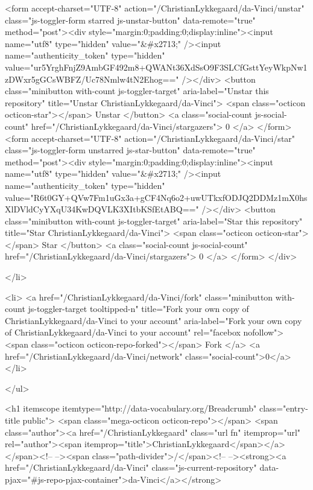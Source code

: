     <form accept-charset="UTF-8" action="/ChristianLykkegaard/da-Vinci/unstar" class="js-toggler-form starred js-unstar-button" data-remote="true" method="post"><div style="margin:0;padding:0;display:inline"><input name="utf8" type="hidden" value="&#x2713;" /><input name="authenticity_token" type="hidden" value="ur5YrghFnjZ9AmbGF492m8+QWANt36XdSsO9F3SLCfGsttYeyWkpNw1zDWxr5gGCsWBFZ/Uc78Nmlw4tN2Ehog==" /></div>
      <button
        class="minibutton with-count js-toggler-target"
        aria-label="Unstar this repository" title="Unstar ChristianLykkegaard/da-Vinci">
        <span class="octicon octicon-star"></span>
        Unstar
      </button>
        <a class="social-count js-social-count" href="/ChristianLykkegaard/da-Vinci/stargazers">
          0
        </a>
</form>
    <form accept-charset="UTF-8" action="/ChristianLykkegaard/da-Vinci/star" class="js-toggler-form unstarred js-star-button" data-remote="true" method="post"><div style="margin:0;padding:0;display:inline"><input name="utf8" type="hidden" value="&#x2713;" /><input name="authenticity_token" type="hidden" value="R6t0GY+QVw7Fm1uGx3a+gCF4Nq6o2+uwUTkxfODJQ2DDMz1mX0hsXlDVldCyYXqU34KwDQVLK3XItbKSfEtABQ==" /></div>
      <button
        class="minibutton with-count js-toggler-target"
        aria-label="Star this repository" title="Star ChristianLykkegaard/da-Vinci">
        <span class="octicon octicon-star"></span>
        Star
      </button>
        <a class="social-count js-social-count" href="/ChristianLykkegaard/da-Vinci/stargazers">
          0
        </a>
</form>  </div>

  </li>

        <li>
          <a href="/ChristianLykkegaard/da-Vinci/fork" class="minibutton with-count js-toggler-target tooltipped-n" title="Fork your own copy of ChristianLykkegaard/da-Vinci to your account" aria-label="Fork your own copy of ChristianLykkegaard/da-Vinci to your account" rel="facebox nofollow">
            <span class="octicon octicon-repo-forked"></span>
            Fork
          </a>
          <a href="/ChristianLykkegaard/da-Vinci/network" class="social-count">0</a>
        </li>

</ul>

        <h1 itemscope itemtype="http://data-vocabulary.org/Breadcrumb" class="entry-title public">
          <span class="mega-octicon octicon-repo"></span>
          <span class="author"><a href="/ChristianLykkegaard" class="url fn" itemprop="url" rel="author"><span itemprop="title">ChristianLykkegaard</span></a></span><!--
       --><span class="path-divider">/</span><!--
       --><strong><a href="/ChristianLykkegaard/da-Vinci" class="js-current-repository" data-pjax="#js-repo-pjax-container">da-Vinci</a></strong>

